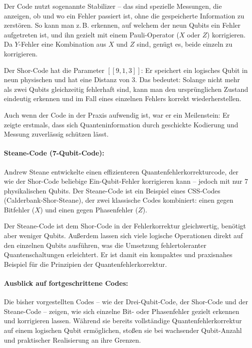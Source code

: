 Der Code nutzt sogenannte Stabilizer – das sind spezielle Messungen, die anzeigen, ob und wo ein Fehler passiert ist, ohne die gespeicherte Information zu zerstören. So kann man z.\,B. erkennen, auf welchem der neun Qubits ein Fehler aufgetreten ist, und ihn gezielt mit einem Pauli-Operator (\(X\) oder \(Z\)) korrigieren. Da \(Y\)-Fehler eine Kombination aus \(X\) und \(Z\) sind, genügt es, beide einzeln zu korrigieren.

Der Shor-Code hat die Parameter \([[9,1,3]]\): Er speichert ein logisches Qubit in neun physischen und hat eine Distanz von 3. Das bedeutet: Solange nicht mehr als zwei Qubits gleichzeitig fehlerhaft sind, kann man den ursprünglichen Zustand eindeutig erkennen und im Fall eines einzelnen Fehlers korrekt wiederherstellen.

Auch wenn der Code in der Praxis aufwendig ist, war er ein Meilenstein: Er zeigte erstmals, dass sich Quanteninformation durch geschickte Kodierung und Messung zuverlässig schützen lässt.\\

\paragraph{Steane-Code (7-Qubit-Code):}

Andrew Steane entwickelte einen effizienteren Quantenfehlerkorrekturcode, der wie der Shor-Code beliebige Ein-Qubit-Fehler korrigieren kann – jedoch mit nur 7 physikalischen Qubits. Der Steane-Code ist ein Beispiel eines CSS-Codes (Calderbank-Shor-Steane), der zwei klassische Codes kombiniert: einen gegen Bitfehler (\(X\)) und einen gegen Phasenfehler (\(Z\)).

Der Steane-Code ist dem Shor-Code in der Fehlerkorrektur gleichwertig, benötigt aber weniger Qubits. Außerdem lassen sich viele logische Operationen direkt auf den einzelnen Qubits ausführen, was die Umsetzung fehlertoleranter Quantenschaltungen erleichtert. Er ist damit ein kompaktes und praxisnahes Beispiel für die Prinzipien der Quantenfehlerkorrektur.\\

\paragraph{Ausblick auf fortgeschrittene Codes:}

Die bisher vorgestellten Codes – wie der Drei-Qubit-Code, der Shor-Code und der Steane-Code – zeigen, wie sich einzelne Bit- oder Phasenfehler gezielt erkennen und korrigieren lassen. Während sie bereits vollständige Quantenfehlerkorrektur auf einem logischen Qubit ermöglichen, stoßen sie bei wachsender Qubit-Anzahl und praktischer Realisierung an ihre Grenzen.

